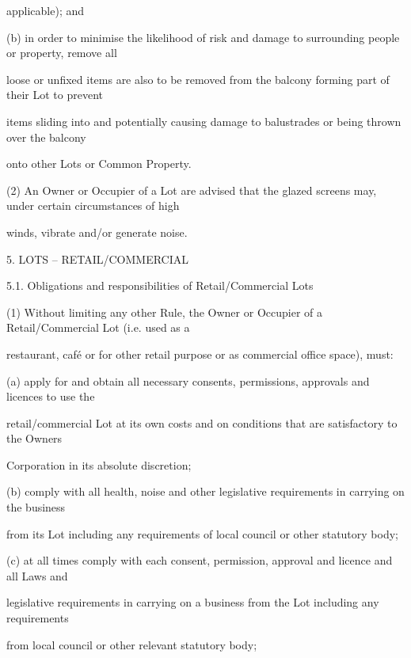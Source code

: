 \documentclass{article}
\begin{document}
{\fontsize{10.02}{1}applicable); and }

{\fontsize{9.962}{1}(b) in order to minimise the likelihood of risk and damage to surrounding people or property, remove all }

{\fontsize{10.02}{1}loose or unfixed items are also to be removed from the balcony forming part of their Lot to prevent }

{\fontsize{10.02}{1}items sliding into and potentially causing damage to balustrades or being thrown over the balcony }

{\fontsize{10.02}{1}onto other Lots or Common Property. }

{\fontsize{9.962}{1}(2) An Owner or Occupier of a Lot are advised that the glazed screens may, under certain circumstances of high }

{\fontsize{10.02}{1}winds, vibrate and/or generate noise. }


{\fontsize{9.99}{1}5. LOTS – RETAIL/COMMERCIAL }

{\fontsize{9.99}{1}5.1. Obligations and responsibilities of Retail/Commercial Lots }

{\fontsize{9.962}{1}(1) Without limiting any other Rule, the Owner or Occupier of a Retail/Commercial Lot (i.e. used as a }

{\fontsize{10.02}{1}restaurant, café or for other retail purpose or as commercial office space), must: }

{\fontsize{9.962}{1}(a) apply for and obtain all necessary consents, permissions, approvals and licences to use the }

{\fontsize{10.02}{1}retail/commercial Lot at its own costs and on conditions that are satisfactory to the Owners }

{\fontsize{10.02}{1}Corporation in its absolute discretion; }

{\fontsize{9.962}{1}(b) comply with all health, noise and other legislative requirements in carrying on the business }

{\fontsize{10.02}{1}from its Lot including any requirements of local council or other statutory body; }

{\fontsize{9.962}{1}(c) at all times comply with each consent, permission, approval and licence and all Laws and }

{\fontsize{10.02}{1}legislative requirements in carrying on a business from the Lot including any requirements }

{\fontsize{10.02}{1}from local council or other relevant statutory body; }
\end{document}
